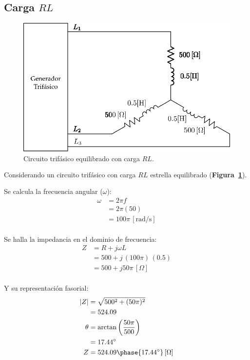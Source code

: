 \documentclass[letter,11pt]{article}
\begin{document}
\subsection{Carga $RL$}
\begin{figure}[!h]
\centering
\includegraphics[scale=0.9]{figura1.eps}
\caption{Circuito trifásico equilibrado con carga $RL$.}
\label{circuito1}
\end{figure}

Considerando un circuito trifásico con carga $RL$ estrella equilibrado
(\textbf{Figura~\ref{circuito1}}).

Se calcula la frecuencia angular ($\omega$):
\begin{equation*}
    \begin{split}
        \omega&=2\pi f\\
              &=2\pi(50)\\
              &=100\pi\,[\text{rad}/\text{s}]\\
    \end{split}
\end{equation*}

Se halla la impedancia en el dominio de frecuencia:
\begin{equation*}
    \begin{split}
        Z &= R+j\omega L\\
          &= 500+j\,(100\pi)\,(0.5)\\
          &= 500+j50\pi\,[\Omega]\\
    \end{split}
\end{equation*}

Y su representación fasorial:
\begin{equation*}
    \begin{split}
        |Z| &= \sqrt{500^2+(50\pi)^2}\\
            &= 524.09\\
        \theta &= \arctan\left(\frac{50\pi}{500}\right)\\
               &= 17.44^{\circ}\\
        Z &= 524.09\phase{17.44^{\circ}}\,[\Omega]\\
    \end{split}
\end{equation*}
\end{document}
